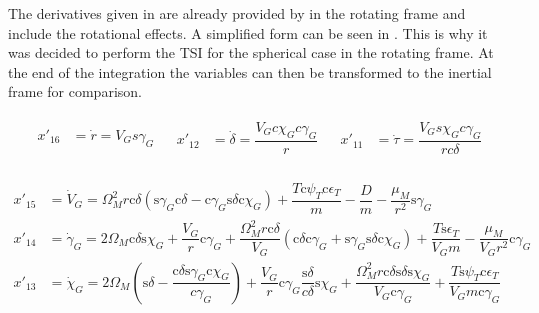 \noindent
The derivatives given in  are already provided by \cite{mooij1994motion} in the rotating frame and include the rotational effects. A simplified form can be seen in . This is why it was decided to perform the \ac{TSI} for the spherical case in the rotating frame. At the end of the integration the variables can then be transformed to the inertial frame for comparison.

\begin{align} \label{eq:kinEqSp}
\begin{split}
x'_{16} &= \dot{r} = V_{G} s \gamma_{G} \\
\end{split}
&
\begin{split}
x'_{12} &= \dot{\delta} = \dfrac{V_{G} c \chi_{G} c \gamma_{G}}{r} \\
\end{split}
&
\begin{split}
x'_{11} &= \dot{\tau} = \dfrac{V_{G} s \chi_{G} c \gamma_{G}}{r c \delta} \\
\end{split}
\end{align}


\begin{equation} \label{eq:dynEqSp}
\begin{split}
x'_{15} &= \dot{V}_{G} =  \Omega_{M}^{2} r \text{c}\delta \left(\text{s}\gamma_{G}\text{c}\delta-\text{c}\gamma_{G}\text{s}\delta \text{c}\chi_{G}\right)+\dfrac{T\text{c}\psi_{T}\text{c}\epsilon_{T}}{m}-\dfrac{D}{m}-\dfrac{\mu_{M}}{r^{2}}\text{s}\gamma_{G} \\
x'_{14} &= \dot{\gamma}_{G} = 2\Omega_{M}\text{c}\delta \text{s}\chi_{G} + \dfrac{V_{G}}{r}\text{c}\gamma_{G}+\dfrac{\Omega_{M}^{2}r \text{c}\delta}{V_{G}}\left(\text{c}\delta \text{c}\gamma_{G}+\text{s}\gamma_{G} \text{s}\delta \text{c}\chi_{G}\right)+\dfrac{T \text{s}\epsilon_{T}}{V_{G}m}-\dfrac{\mu_{M}}{V_{G}r^{2}}\text{c}\gamma_{G} \\
x'_{13} &= \dot{\chi}_{G} = 2 \Omega_{M} \left(\text{s}\delta-\dfrac{\text{c}\delta \text{s}\gamma_{G} \text{c}\chi_{G}}{c \gamma_{G}}\right)+\dfrac{V_{G}}{r}\text{c}\gamma_{G}\dfrac{\text{s}\delta}{c \delta}\text{s}\chi_{G}+\dfrac{\Omega_{M}^{2}r \text{c}\delta \text{s}\delta \text{s}\chi_{G}}{V_{G}\text{c}\gamma_{G}}+\dfrac{T \text{s}\psi_{T}\text{c}\epsilon_{T}}{V_{G}m \text{c}\gamma_{G}} \\
\end{split}
\end{equation}

